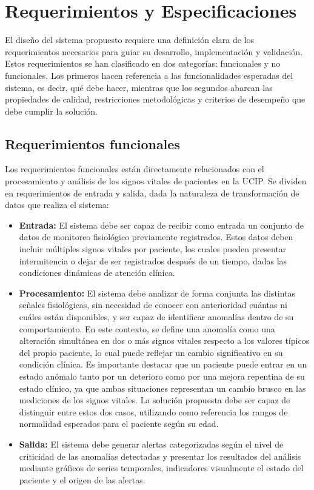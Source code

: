 \chapter{Requerimientos y Especificaciones}

El diseño del sistema propuesto requiere una definición clara de los requerimientos necesarios para guiar su desarrollo, implementación y validación. Estos requerimientos se han clasificado en dos categorías: funcionales y no funcionales. Los primeros hacen referencia a las funcionalidades esperadas del sistema, es decir, qué debe hacer, mientras que los segundos abarcan las propiedades de calidad, restricciones metodológicas y criterios de desempeño que debe cumplir la solución.

\section{Requerimientos funcionales}

Los requerimientos funcionales están directamente relacionados con el procesamiento y análisis de los signos vitales de pacientes en la UCIP. Se dividen en requerimientos de entrada y salida, dada la naturaleza de transformación de datos que realiza el sistema:

\begin{itemize}
  \item \textbf{Entrada:} El sistema debe ser capaz de recibir como entrada un conjunto de datos de monitoreo fisiológico previamente registrados. Estos datos deben incluir múltiples signos vitales por paciente, los cuales pueden presentar intermitencia o dejar de ser registrados después de un tiempo, dadas las condiciones dinámicas de atención clínica.

  \item \textbf{Procesamiento:} El sistema debe analizar de forma conjunta las distintas señales fisiológicas, sin necesidad de conocer con anterioridad cuántas ni cuáles están disponibles, y ser capaz de identificar anomalías dentro de su comportamiento. En este contexto, se define una anomalía como una alteración simultánea en dos o más signos vitales respecto a los valores típicos del propio paciente, lo cual puede reflejar un cambio significativo en su condición clínica. Es importante destacar que un paciente puede entrar en un estado anómalo tanto por un deterioro como por una mejora repentina de su estado clínico, ya que ambas situaciones representan un cambio brusco en las mediciones de los signos vitales. La solución propuesta debe ser capaz de distinguir entre estos dos casos, utilizando como referencia los rangos de normalidad esperados para el paciente según su edad.

  \item \textbf{Salida:} El sistema debe generar alertas categorizadas según el nivel de criticidad de las anomalías detectadas y presentar los resultados del análisis mediante gráficos de series temporales, indicadores visualmente el estado del paciente y el origen de las alertas.

\end{itemize}

